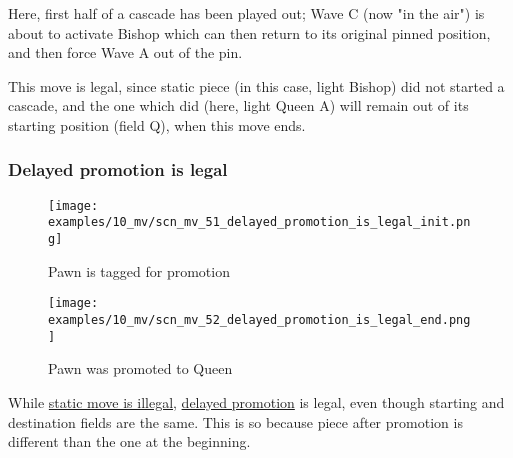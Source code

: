 \vspace*{-0.4\baselineskip}
Here, first half of a cascade has been played out; Wave C (now "in the air") is
about to activate Bishop which can then return to its original pinned position,
and then force Wave A out of the pin.

This move is legal, since static piece (in this case, light Bishop) did not started
a cascade, and the one which did (here, light Queen A) will remain out of its
starting position (field Q), when this move ends.

\clearpage %

\subsubsection*{Delayed promotion is legal}
\label{sec:Miranda's veil/Wave/Cascading Waves/Delayed promotion is legal}

\noindent
\begin{figure}[!h]
\texttt{[image: examples/10\_mv/scn\_mv\_51\_delayed\_promotion\_is\_legal\_init.png]}
\caption{Pawn is tagged for promotion}
\label{fig:scn_mv_51_delayed_promotion_is_legal_init}
\end{figure}

\noindent
\begin{figure}[!h]
\texttt{[image: examples/10\_mv/scn\_mv\_52\_delayed\_promotion\_is\_legal\_end.png]}
\caption{Pawn was promoted to Queen}
\label{fig:scn_mv_52_delayed_promotion_is_legal_end}
\end{figure}

While \hyperref[fig:scn_mv_47_static_move_is_illegal_init]{static move is illegal},
\hyperref[sec:Age of Aquarius/Promotion]{delayed promotion} is legal, even though
starting and destination fields are the same. This is so because piece after
promotion is different than the one at the beginning.

\clearpage %

